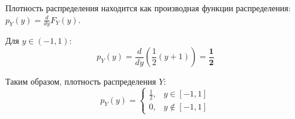 \documentclass[a4paper,14pt]{extarticle}
\begin{document}
    Плотность распределения находится как производная функции распределения: $p_Y(y) = \frac{d}{dy} F_Y(y)$.

    Для $y \in (-1, 1)$:
    $$
    p_Y(y) = \frac{d}{dy} \left( \frac{1}{2}(y + 1) \right) = \mathbf{\frac{1}{2}}
    $$

    Таким образом, плотность распределения $Y$:
    $$
    \boxed{p_Y(y) = \begin{cases} 
    \frac{1}{2}, & y \in [-1, 1] \\
    0, & y \notin [-1, 1]
    \end{cases}}
    $$
            
\end{document}

